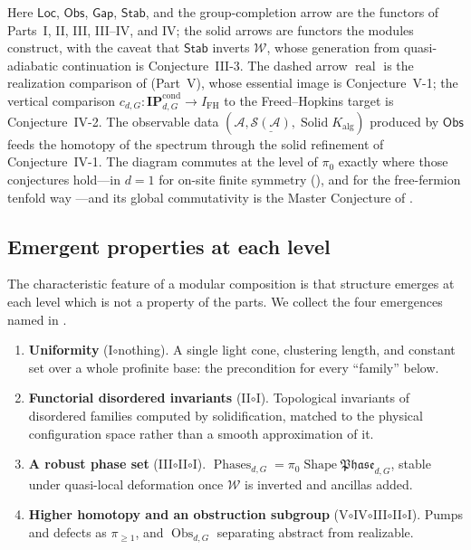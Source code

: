 \documentclass[12pt]{article}
\newcommand{\cond}[1]{\underline{#1}}          %
\newcommand{\Shape}{\operatorname{Shape}}      %
\newcommand{\Phase}{\mathfrak{Phase}}          %
\newcommand{\Phases}{\operatorname{Phases}}    %
\newcommand{\Weq}{\mathcal{W}}                 %
\newcommand{\IPcond}{\mathbf{IP}^{\mathrm{cond}}}  %
\newcommand{\Kalg}{K_{\mathrm{alg}}}           %
\newcommand{\Solid}{\operatorname{Solid}}      %
\newcommand{\qA}{\mathcal{A}}                  %
\newcommand{\St}{\mathcal{S}}                  %
\newcommand{\IFH}{I_{\mathrm{FH}}}             %
\newcommand{\real}{\operatorname{real}}        %
\newcommand{\Obs}{\operatorname{Obs}}
\theoremstyle{plain}
\theoremstyle{definition}
\theoremstyle{remark}
\begin{document}
Here $\mathsf{Loc}$, $\mathsf{Obs}$, $\mathsf{Gap}$, $\mathsf{Stab}$, and the
group-completion arrow are the functors of Parts~I, II, III, III--IV, and IV\@; the solid
arrows are functors the modules construct, with the caveat that $\mathsf{Stab}$ inverts
$\Weq$, whose generation from quasi-adiabatic continuation is Conjecture~III-3. The dashed
arrow $\real$ is the realization comparison of  (Part~V), whose essential
image is Conjecture~V-1; the vertical comparison $c_{d,G}:\IPcond_{d,G}\to\IFH$ to the
Freed--Hopkins target is Conjecture~IV-2. The observable data
$(\qA,\cond{\St(\qA)},\Solid\Kalg)$ produced by $\mathsf{Obs}$ feeds the homotopy of the
spectrum through the solid refinement of Conjecture~IV-1. The diagram commutes at the level
of $\pi_0$ exactly where those conjectures hold---in $d=1$ for on-site finite symmetry
(), and for the free-fermion tenfold way
\cite{kitaev-periodic-table,altland-zirnbauer}---and its global commutativity is the Master
Conjecture of .

\subsection{Emergent properties at each level}
\label{sec:emergent}

The characteristic feature of a modular composition is that structure emerges at each
level which is not a property of the parts. We collect the four emergences named in
.

\begin{enumerate}
\item \textbf{Uniformity} (I$\circ$nothing). A single light cone, clustering length, and
  constant set over a whole profinite base: the precondition for every ``family'' below.
\item \textbf{Functorial disordered invariants} (II$\circ$I). Topological invariants of
  disordered families computed by solidification, matched to the physical configuration
  space rather than a smooth approximation of it.
\item \textbf{A robust phase set} (III$\circ$II$\circ$I). $\Phases_{d,G}=\pi_0\Shape\Phase_{d,G}$,
  stable under quasi-local deformation once $\Weq$ is inverted and ancillas added.
\item \textbf{Higher homotopy and an obstruction subgroup}
  (V$\circ$IV$\circ$III$\circ$II$\circ$I). Pumps and defects as $\pi_{\ge1}$, and
  $\Obs_{d,G}$ separating abstract from realizable.
\end{enumerate}
\end{document}
